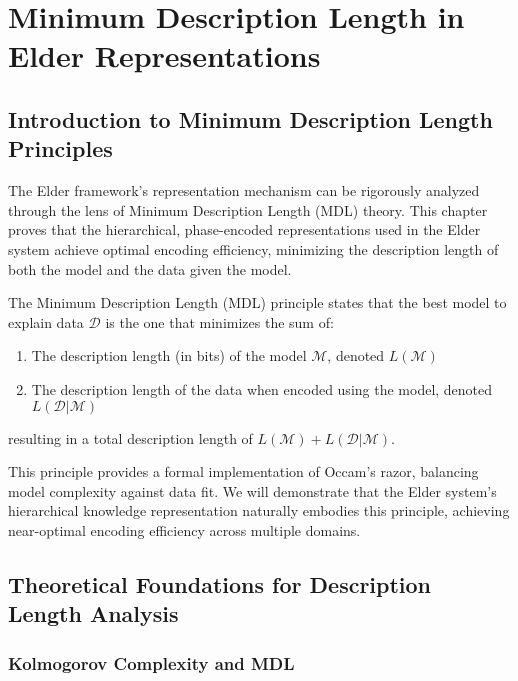 \chapter{Minimum Description Length in Elder Representations}

\section{Introduction to Minimum Description Length Principles}

The Elder framework's representation mechanism can be rigorously analyzed through the lens of Minimum Description Length (MDL) theory. This chapter proves that the hierarchical, phase-encoded representations used in the Elder system achieve optimal encoding efficiency, minimizing the description length of both the model and the data given the model.

\begin{definition}
The Minimum Description Length (MDL) principle states that the best model to explain data $\mathcal{D}$ is the one that minimizes the sum of:
\begin{enumerate}
    \item The description length (in bits) of the model $\mathcal{M}$, denoted $L(\mathcal{M})$
    \item The description length of the data when encoded using the model, denoted $L(\mathcal{D} | \mathcal{M})$
\end{enumerate}
resulting in a total description length of $L(\mathcal{M}) + L(\mathcal{D} | \mathcal{M})$.
\end{definition}

This principle provides a formal implementation of Occam's razor, balancing model complexity against data fit. We will demonstrate that the Elder system's hierarchical knowledge representation naturally embodies this principle, achieving near-optimal encoding efficiency across multiple domains.

\section{Theoretical Foundations for Description Length Analysis}

\subsection{Kolmogorov Complexity and MDL}


